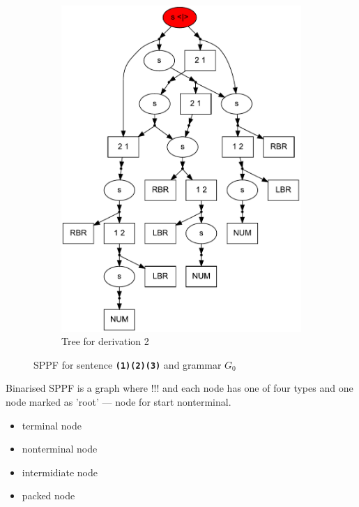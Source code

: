 \documentclass{sig-alternate} %
\begin{document}
\begin{figure}[ht]
\begin{center}
\begin{subfigure}[b]{0.3\textwidth}
        \includegraphics[width=\textwidth]{dot/Brackets.pdf}
        \caption{Tree for derivation 2}
        \label{tree2}        
    \end{subfigure}
    \caption{SPPF for sentence \textbf{\texttt{(1)(2)(3)}} and grammar $G_0$}
    \label{sppfSample}
    \end{center}                \end{figure}

Binarised SPPF is a graph where !!! and each node has one of four types and one node marked as 'root' --- node for start nonterminal.

\begin{itemize}
    \item terminal node
    \item nonterminal node
    \item intermidiate node
    \item packed node
\end{itemize}
\end{document}
